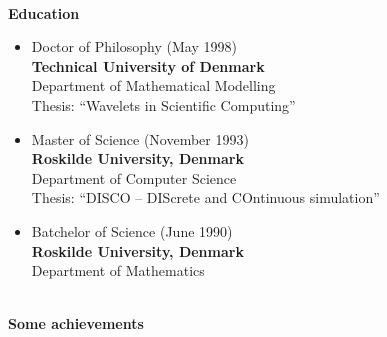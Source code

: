 \documentclass[11pt,a4paper]{article}
\begin{document}
\pagebreak
\begin{center}
  \hrulefill \\
  {\bf Education} \\[-0.2cm]
  \hrulefill
\end{center}

\begin{itemize}
\item Doctor of Philosophy (May 1998) \\
{\bf Technical University of Denmark} \\
Department of Mathematical Modelling  \\
Thesis: ``Wavelets in Scientific Computing''\\

\item  Master of Science (November 1993) \\
{\bf Roskilde University, Denmark} \\
Department of Computer Science \\
Thesis: ``DISCO -- DIScrete and COntinuous simulation''\\

\item  Batchelor of Science (June 1990) \\
{\bf Roskilde University, Denmark} \\
Department of Mathematics \\
\end{itemize}


\pagebreak

\begin{center}
  \hrulefill \\
  {\bf Some achievements} \\[-0.2cm]
  \hrulefill
\end{center}
\end{document}
